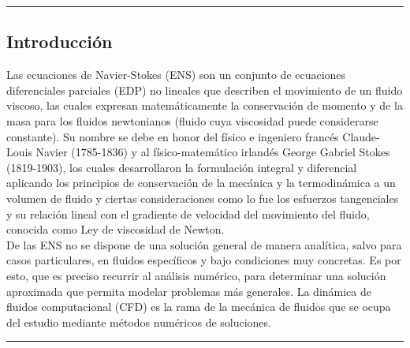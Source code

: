 \documentclass[A4,10pt]{article}
\begin{document}
\begin{center}\rule{0.9\textwidth}{0.1mm}
 \end{center}
\begin{multicols}{2}


\section{Introducción}

Las ecuaciones de Navier-Stokes (ENS) son un conjunto de ecuaciones diferenciales parciales (EDP) no lineales que describen el movimiento de un fluido viscoso, las cuales expresan matemáticamente la conservación de momento  y de la masa para los fluidos newtonianos (fluido cuya viscosidad puede considerarse constante)\cite{Achenson}.  Su nombre se debe en honor del físico e ingeniero francés Claude-Louis Navier (1785-1836) y al físico-matemático irlandés George Gabriel Stokes (1819-1903), los cuales desarrollaron la formulación integral y diferencial aplicando los principios de conservación de la mecánica y la termodinámica a un volumen de fluido y ciertas consideraciones como lo fue los esfuerzos tangenciales y su relación lineal con el gradiente de velocidad del movimiento del fluido, conocida como Ley de viscosidad de Newton\cite{Achenson}.\\


De las ENS no se dispone de una solución general de manera analítica, salvo para casos particulares, en fluidos específicos y bajo condiciones muy concretas\cite{Girault,Achenson}. Es por esto, que es preciso recurrir al análisis numérico, para determinar una solución aproximada que permita modelar problemas más generales. La dinámica de fluidos computacional (CFD) es la rama de la mecánica de fluidos que se ocupa del estudio mediante métodos numéricos de soluciones\cite{Barbagroup,Girault}.
\end{multicols}
\begin{center}\rule{0.9\textwidth}{0.1mm}
\end{center}
\end{document}

